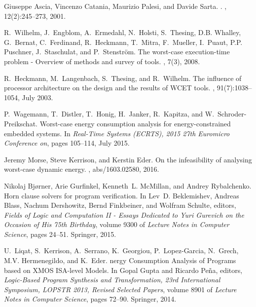 \documentclass[oneside]{book}
\begin{document}
\begin{thebibliography}{10}
Giuseppe Ascia, Vincenzo Catania, Maurizio Palesi, and Davide Sarta.
.
, {12}({2}):{245--273}, {2001}.

R.~Wilhelm, J.~Engblom, A.~Ermedahl, N.~Holsti, S.~Thesing, D.B. Whalley,
  G.~Bernat, C.~Ferdinand, R.~Heckmann, T.~Mitra, F.~Mueller, I.~Puaut, P.P.
  Puschner, J.~Staschulat, and P.~Stenstr{\"o}m.
\newblock The worst-case execution-time problem - {O}verview of methods and
  survey of tools.
, 7(3), 2008.

R.~Heckmann, M.~Langenbach, S.~Thesing, and R.~Wilhelm.
\newblock The influence of processor architecture on the design and the results
  of {WCET} tools.
, 91(7):1038--1054, July 2003.

P.~Wagemann, T.~Distler, T.~Honig, H.~Janker, R.~Kapitza, and
  W.~Schroder-Preikschat.
\newblock Worst-case energy consumption analysis for energy-constrained
  embedded systems.
\newblock In {\em Real-Time Systems (ECRTS), 2015 27th Euromicro Conference
  on}, pages 105--114, July 2015.

Jeremy Morse, Steve Kerrison, and Kerstin Eder.
\newblock On the infeasibility of analysing worst-case dynamic energy.
, abs/1603.02580, 2016.

Nikolaj Bj{\o}rner, Arie Gurfinkel, Kenneth~L. McMillan, and Andrey
  Rybalchenko.
\newblock Horn clause solvers for program verification.
\newblock In Lev~D. Beklemishev, Andreas Blass, Nachum Dershowitz, Bernd
  Finkbeiner, and Wolfram Schulte, editors, {\em Fields of Logic and
  Computation {II} - Essays Dedicated to Yuri Gurevich on the Occasion of His
  75th Birthday}, volume 9300 of {\em Lecture Notes in Computer Science}, pages
  24--51. Springer, 2015.

U.~Liqat, S.~Kerrison, A.~Serrano, K.~Georgiou, P.~Lopez-Garcia, N.~Grech, M.V.
  Hermenegildo, and K.~Eder.
nergy {C}onsumption {A}nalysis of {P}rograms based on {XMOS}
  {ISA}-level {M}odels.
\newblock In Gopal Gupta and Ricardo Peña, editors, {\em Logic-Based Program
  Synthesis and Transformation, 23rd International Symposium, {LOPSTR} 2013,
  Revised Selected Papers}, volume 8901 of {\em Lecture Notes in Computer
  Science}, pages 72--90. Springer, 2014.


\end{thebibliography}
\end{document}
